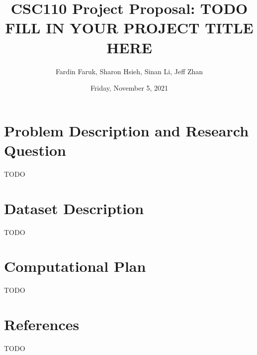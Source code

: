 \documentclass[fontsize=11pt]{article}
\title{CSC110 Project Proposal: TODO FILL IN YOUR PROJECT TITLE HERE}
\author{Fardin Faruk, Sharon Hsieh, Sinan Li, Jeff Zhan}
\date{Friday, November 5, 2021}
\begin{document}
    \maketitle

    \section*{Problem Description and Research Question}

    TODO

    \section*{Dataset Description}

    TODO

    \section*{Computational Plan}

    TODO

    \section*{References}

    TODO

\end{document}
